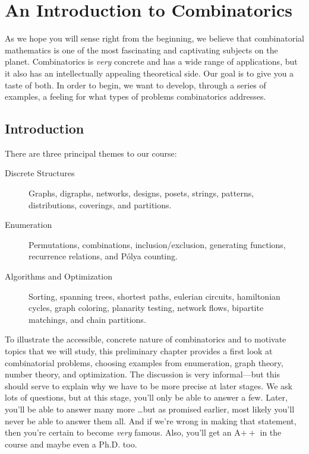 
\chapter{An Introduction to Combinatorics}\label{ch:intro}

As we hope you will sense right from the beginning, we believe that
combinatorial mathematics is one of the most fascinating and
captivating subjects on the planet.  Combinatorics is \textit{very}
concrete and has a wide range of applications, but it also has an
intellectually appealing theoretical side. Our goal is to give you a
taste of both. In order to begin, we want to develop, through a series
of examples, a feeling for what types of problems combinatorics addresses.

\section{Introduction}\label{s:intro:intro}

There are three principal themes to our course:

\begin{description}
\item[Discrete Structures] Graphs, digraphs, networks, designs, posets, 
strings, patterns, distributions, coverings, and partitions.
\item[Enumeration] Permutations, combinations, inclusion/exclusion, 
generating functions, recurrence relations, and P\'olya counting. 
\item[Algorithms and Optimization] Sorting, spanning trees, shortest 
paths, eulerian circuits, hamiltonian cycles, graph coloring, 
planarity testing, network flows, bipartite matchings, and chain partitions. 
\end{description}

To illustrate the accessible, concrete nature of combinatorics and to
motivate topics that we will study, this preliminary chapter provides
a first look at combinatorial problems, choosing examples from
enumeration, graph theory, number theory, and optimization.  The
discussion is very informal---but this should serve to explain why we
have to be more precise at later stages.  We ask lots of questions,
but at this stage, you'll only be able to answer a few.  Later, you'll
be able to answer many more \dots but as promised earlier, most likely
you'll never be able to answer them all.  And if we're wrong in making
that statement, then you're certain to become \textit{very} famous.
Also, you'll get an A$++$ in the course and maybe even a Ph.D. too.

